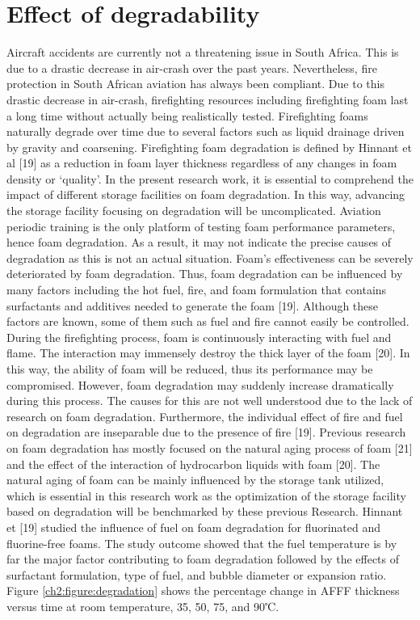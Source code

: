 \documentclass[12pt]{report}
\begin{document}
\section{Effect of degradability}
Aircraft accidents are currently not a threatening issue in South Africa. This is due to a drastic decrease in air-crash over the past years. Nevertheless, fire protection in South African aviation has always been compliant. Due to this drastic decrease in air-crash, firefighting resources including firefighting foam last a long time without actually being realistically tested. Firefighting foams naturally degrade over time due to several factors such as liquid drainage driven by gravity and coarsening. Firefighting foam degradation is defined by Hinnant et al [19] as a reduction in foam layer thickness regardless of any changes in foam density or ‘quality’.
In the present research work, it is essential to comprehend the impact of different storage facilities on foam degradation. In this way, advancing the storage facility focusing on degradation will be uncomplicated. Aviation periodic training is the only platform of testing foam performance parameters, hence foam degradation. As a result, it may not indicate the precise causes of degradation as this is not an actual situation. Foam’s effectiveness can be severely deteriorated by foam degradation. Thus, foam degradation can be influenced by many factors including the hot fuel, fire, and foam formulation that contains surfactants and additives needed to generate the foam [19]. Although these factors are known, some of them such as fuel and fire cannot easily be controlled.    
During the firefighting process, foam is continuously interacting with fuel and flame. The interaction may immensely destroy the thick layer of the foam [20]. In this way, the ability of foam will be reduced, thus its performance may be compromised. However, foam degradation may suddenly increase dramatically during this process.  The causes for this are not well understood due to the lack of research on foam degradation. Furthermore, the individual effect of fire and fuel on degradation are inseparable due to the presence of fire [19]. 
Previous research on foam degradation has mostly focused on the natural aging process of foam [21] and the effect of the interaction of hydrocarbon liquids with foam [20].  The natural aging of foam can be mainly influenced by the storage tank utilized, which is essential in this research work as the optimization of the storage facility based on degradation will be benchmarked by these previous Research. Hinnant et [19] studied the influence of fuel on foam degradation for fluorinated and fluorine-free foams. The study outcome showed that the fuel temperature is by far the major factor contributing to foam degradation followed by the effects of surfactant formulation, type of fuel, and bubble diameter or expansion ratio. Figure \ref{ch2:figure:degradation} shows the percentage change in AFFF thickness versus time at room temperature, 35, 50, 75, and 90℃.
\end{document}
